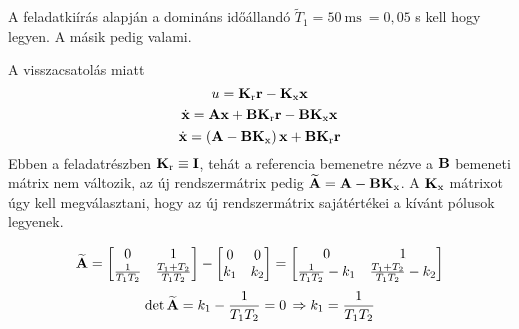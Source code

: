 A feladatkiírás alapján a domináns időállandó $\widetilde{T}_1=50~\text{ms}~=0,05$ s
kell hogy legyen. A másik pedig valami.%

A visszacsatolás miatt
\begin{equation}
	u = \B{K}_\text{r}\B{r} - \B{K}_\text{x}\B{x}
\end{equation}
\begin{equation}
	\dot{\B{x}} = \B{A}\B{x} + \B{B}\B{K}_\text{r}\B{r} - \B{B}\B{K}_\text{x}\B{x}
\end{equation}
\begin{equation}
	\dot{\B{x}} = \brc{\B{A}-\B{B}\B{K}_\text{x}}\B{x} + \B{B}\B{K}_\text{r}\B{r}
\end{equation}
Ebben a feladatrészben $\B{K}_\text{r} \equiv \B{I}$, tehát a referencia bemenetre nézve
a $\B{B}$ bemeneti mátrix nem változik, az új rendszermátrix pedig $\widetilde{\B{A}} = \B{A}-\B{B}\B{K}_\text{x}$.
A $\B{K}_\text{x}$ mátrixot úgy kell megválasztani, hogy az új rendszermátrix sajátértékei
a kívánt pólusok legyenek.

\begin{equation}
	\widetilde{\B{A}} = \mat{0&1\\\frac{1}{T_1T_2}&\frac{T_1+T_2}{T_1T_2}} - 
	\mat{0&0\\k_1&k_2} = \mat{0&1\\\frac{1}{T_1T_2}-k_1&\frac{T_1+T_2}{T_1T_2}-k_2}
\end{equation}
\begin{equation}
	\det\widetilde{\B{A}} = k_1 - \frac{1}{T_1T_2} = 0\,\Rightarrow k_1=\frac{1}{T_1T_2}
\end{equation}

